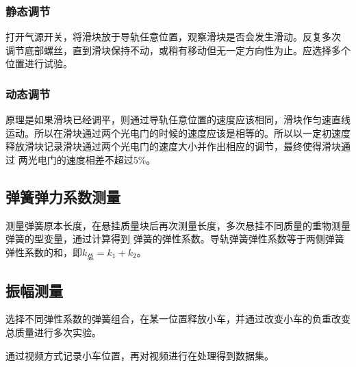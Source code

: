 \documentclass{ctexart}
\begin{document}
    \subsubsection{静态调节}
    打开气源开关，将滑块放于导轨任意位置，观察滑块是否会发生滑动。反复多次
    调节底部螺丝，直到滑块保持不动，或稍有移动但无一定方向性为止。应选择多个
    位置进行试验。
    \subsubsection{动态调节}
    原理是如果滑块已经调平，则通过导轨任意位置的速度应该相同，滑块作匀速直线
    运动。所以在滑块通过两个光电门的时候的速度应该是相等的。所以以一定初速度
    释放滑块记录滑块通过两个光电门的速度大小并作出相应的调节，最终使得滑块通过
    两光电门的速度相差不超过5\%。
  \subsection{弹簧弹力系数测量}
  测量弹簧原本长度，在悬挂质量块后再次测量长度，多次悬挂不同质量的重物测量弹簧的型变量，通过计算得到
  弹簧的弹性系数。导轨弹簧弹性系数等于两侧弹簧弹性系数的和，即$k_{\mbox{总}}=k_{1}+k_{2}$。
  \subsection{振幅测量}
  选择不同弹性系数的弹簧组合，在某一位置释放小车，并通过改变小车的负重改变总质量进行多次实验。

  通过视频方式记录小车位置，再对视频进行在处理得到数据集。
\newpage
\end{document}

